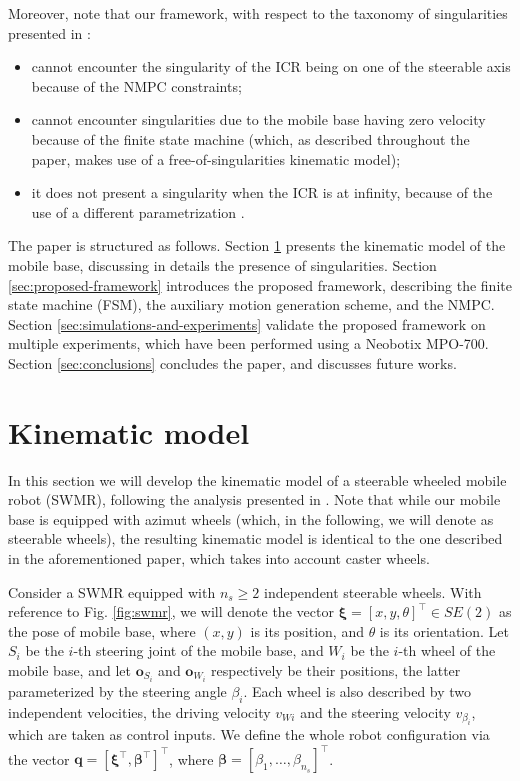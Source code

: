 Moreover, note that our framework, with respect to the taxonomy of singularities presented in \cite{Sorour2017RAL}:
\begin{itemize}
    \item cannot encounter the singularity of the ICR being on one of the steerable axis because of the NMPC constraints;
    \item cannot encounter singularities due to the mobile base having zero velocity because of the finite state machine (which, as described throughout the paper, makes use of a free-of-singularities kinematic model);
    \item it does not present a singularity when the ICR is at infinity, because of the use of a different parametrization \cite{RobuffoGiordano2009ICRA}.
\end{itemize}  

The paper is structured as follows. Section \ref{sec:kinematic-model} presents the kinematic model of the mobile base, discussing in details the presence of singularities. Section \ref{sec:proposed-framework} introduces the proposed framework, describing the finite state machine (FSM), the auxiliary motion generation scheme, and the NMPC. Section \ref{sec:simulations-and-experiments} validate the proposed framework on multiple experiments, which have been performed using a Neobotix MPO-700. Section \ref{sec:conclusions} concludes the paper, and discusses future works.

\section{Kinematic model}
\label{sec:kinematic-model}
In this section we will develop the kinematic model of a steerable wheeled mobile robot (SWMR), following the analysis presented in \cite{RobuffoGiordano2009ICRA}. Note that while our mobile base is equipped with azimut wheels (which, in the following, we will denote as steerable wheels), the resulting kinematic model is identical to the one described in the aforementioned paper, which takes into account caster wheels.

Consider a SWMR equipped with $n_s \ge 2$ independent steerable wheels. With reference to Fig. \ref{fig:swmr}, we will denote the vector $\bm{\xi} = [x, y, \theta]^\top \in SE(2)$ as the pose of mobile base, where $(x, y)$ is its position, and $\theta$ is its orientation. Let $S_i$ be the $i$-th steering joint of the mobile base, and $W_i$ be the $i$-th wheel of the mobile base, and let $\bm{o}_{S_i}$ and $\bm{o}_{W_i}$ respectively be their positions, the latter parameterized by the steering angle $\beta_i$. Each wheel is also described by two independent velocities, the driving velocity $v_{Wi}$ and the steering velocity $v_{\beta_i}$, which are taken as control inputs. We define the whole robot configuration via the vector $\bm{q}=[\bm{\xi}^\top, \bm{\beta}^\top]^\top$, where $\bm{\beta}=[\beta_1, \dots, \beta_{n_s}]^\top$.

